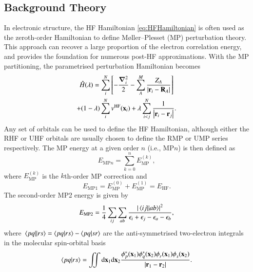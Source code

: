 \documentclass[aps,prb,reprint,noshowkeys,superscriptaddress]{revtex4-1}
\newcommand{\latin}[1]{#1}
\newcommand{\ie}{\latin{i.e.}}
\newcommand{\hH}{\Hat{H}}
\begin{document}
\subsection{Background Theory}

In electronic structure, the HF Hamiltonian \eqref{eq:HFHamiltonian} is often used as the zeroth-order Hamiltonian
to define M\o{}ller--Plesset (MP) perturbation theory.\cite{Moller_1934}
This approach can recover a large proportion of the electron correlation energy,\cite{Lowdin_1955a,Lowdin_1955b,Lowdin_1955c} 
and provides the foundation for numerous post-HF approximations.
With the MP partitioning, the parametrised perturbation Hamiltonian becomes
\begin{multline}\label{eq:MPHamiltonian}
    \hH(\lambda) =   
     \sum_{i}^{N} \qty[ - \frac{\grad_i^2}{2} - \sum_{A}^{M} \frac{Z_A}{\abs{\vb{r}_i-\vb{R}_A}} ]
    \\
    + (1-\lambda) \sum_{i}^{N} v^{\text{HF}}(\vb{x}_i)
    + \lambda\sum_{i<j}^{N}\frac{1}{\abs{\vb{r}_i-\vb{r}_j}}.
\end{multline}
Any set of orbitals can be used to define the HF Hamiltonian, although either the RHF or UHF orbitals are usually chosen to 
define the RMP or UMP series respectively.
The MP energy at a given order $n$ (\ie, MP$n$) is then defined as
\begin{equation}
	E_{\text{MP}n}= \sum_{k=0}^n E_{\text{MP}}^{(k)},
\end{equation}
where $E_{\text{MP}}^{(k)}$ is the $k$th-order MP correction and 
\begin{equation}
E_{\text{MP1}} =  E_{\text{MP}}^{(0)} + E_{\text{MP}}^{(1)} = E_\text{HF}.
\end{equation}
The second-order MP2 energy is given by
\begin{equation}\label{eq:EMP2}
	E_{\text{MP2}} = \frac{1}{4} \sum_{ij} \sum_{ab} \frac{\abs{\mel{ij}{}{ab}}^2}{\epsilon_i + \epsilon_j - \epsilon_a - \epsilon_b},
\end{equation}
where $\mel{pq}{}{rs} = \braket{pq}{rs} - \braket{pq}{sr}$ are the anti-symmetrised two-electron integrals
in the molecular spin-orbital basis\cite{Gill_1994}
\begin{equation}
	\braket{pq}{rs} 
    = \iint \dd\vb{x}_1\dd\vb{x}_2
    \frac{\phi^{*}_p(\vb{x}_1)\phi^{*}_q(\vb{x}_2)\phi^{\vphantom{*}}_r(\vb{x}_1)\phi^{\vphantom{*}}_s(\vb{x}_2)}%
      {\abs{\vb{r}_1 - \vb{r}_2}}.
\end{equation}
\end{document}
